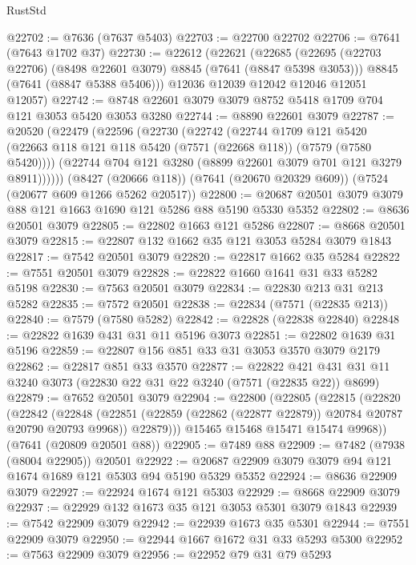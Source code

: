 \begin{lexlean}{RustStd}
\begin{coremodule}
@22702 := @7636 (@7637 @5403)
@22703 := @22700 @22702
@22706 := @7641 (@7643 @1702 @37)
@22730 := @22612
    (@22621
      (@22685
        (@22695 (@22703 @22706) (@8498 @22601 @3079) @8845 (@7641 (@8847 @5398 @3053)))
        @8845
        (@7641 (@8847 @5388 @5406)))
      @12036
      @12039
      @12042
      @12046
      @12051
      @12057)
@22742 := @8748 @22601 @3079 @3079 @8752 @5418 @1709 @704 @121 @3053 @5420 @3053 @3280
@22744 := @8890 @22601 @3079
@22787 := @20520
    (@22479
      (@22596
        (@22730
          (@22742
            (@22744
              @1709
              @121
              @5420
              (@22663 @118 @121 @118 @5420 (@7571 (@22668 @118)) (@7579 (@7580 @5420))))
            (@22744 @704 @121 @3280 (@8899 @22601 @3079 @701 @121 @3279 @8911))))))
    (@8427 (@20666 @118))
    (@7641 (@20670 @20329 @609))
    (@7524 (@20677 @609 @1266 @5262 @20517))
@22800 := @20687 @20501 @3079 @3079 @88 @121 @1663 @1690 @121 @5286 @88 @5190 @5330 @5352
@22802 := @8636 @20501 @3079
@22805 := @22802 @1663 @121 @5286
@22807 := @8668 @20501 @3079
@22815 := @22807 @132 @1662 @35 @121 @3053 @5284 @3079 @1843
@22817 := @7542 @20501 @3079
@22820 := @22817 @1662 @35 @5284
@22822 := @7551 @20501 @3079
@22828 := @22822 @1660 @1641 @31 @33 @5282 @5198
@22830 := @7563 @20501 @3079
@22834 := @22830 @213 @31 @213 @5282
@22835 := @7572 @20501
@22838 := @22834 (@7571 (@22835 @213))
@22840 := @7579 (@7580 @5282)
@22842 := @22828 (@22838 @22840)
@22848 := @22822 @1639 @431 @31 @11 @5196 @3073
@22851 := @22802 @1639 @31 @5196
@22859 := @22807 @156 @851 @33 @31 @3053 @3570 @3079 @2179
@22862 := @22817 @851 @33 @3570
@22877 := @22822 @421 @431 @31 @11 @3240 @3073 (@22830 @22 @31 @22 @3240 (@7571 (@22835 @22)) @8699)
@22879 := @7652 @20501 @3079
@22904 := @22800
    (@22805
      (@22815
        (@22820
          (@22842
            (@22848
              (@22851 (@22859 (@22862 (@22877 @22879)) @20784 @20787 @20790 @20793 @9968))
              @22879)))
        @15465
        @15468
        @15471
        @15474
        @9968))
    (@7641 (@20809 @20501 @88))
@22905 := @7489 @88
@22909 := @7482 (@7938 (@8004 @22905)) @20501
@22922 := @20687 @22909 @3079 @3079 @94 @121 @1674 @1689 @121 @5303 @94 @5190 @5329 @5352
@22924 := @8636 @22909 @3079
@22927 := @22924 @1674 @121 @5303
@22929 := @8668 @22909 @3079
@22937 := @22929 @132 @1673 @35 @121 @3053 @5301 @3079 @1843
@22939 := @7542 @22909 @3079
@22942 := @22939 @1673 @35 @5301
@22944 := @7551 @22909 @3079
@22950 := @22944 @1667 @1672 @31 @33 @5293 @5300
@22952 := @7563 @22909 @3079
@22956 := @22952 @79 @31 @79 @5293

\end{coremodule}
\end{lexlean}

